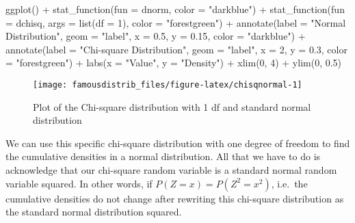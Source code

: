 \documentclass[
]{article}
\newenvironment{Shaded}{\begin{snugshade}}{\end{snugshade}}
\newcommand{\AttributeTok}[1]{\textcolor[rgb]{0.77,0.63,0.00}{#1}}
\newcommand{\DecValTok}[1]{\textcolor[rgb]{0.00,0.00,0.81}{#1}}
\newcommand{\FloatTok}[1]{\textcolor[rgb]{0.00,0.00,0.81}{#1}}
\newcommand{\FunctionTok}[1]{\textcolor[rgb]{0.00,0.00,0.00}{#1}}
\newcommand{\NormalTok}[1]{#1}
\newcommand{\SpecialCharTok}[1]{\textcolor[rgb]{0.00,0.00,0.00}{#1}}
\newcommand{\StringTok}[1]{\textcolor[rgb]{0.31,0.60,0.02}{#1}}
\begin{document}
\begin{Shaded}
\begin{Highlighting}[]
\FunctionTok{ggplot}\NormalTok{() }\SpecialCharTok{+}
  \FunctionTok{stat\_function}\NormalTok{(}\AttributeTok{fun =}\NormalTok{ dnorm,}
                \AttributeTok{color =} \StringTok{"darkblue"}\NormalTok{) }\SpecialCharTok{+}
  \FunctionTok{stat\_function}\NormalTok{(}\AttributeTok{fun =}\NormalTok{ dchisq,}
                \AttributeTok{args =} \FunctionTok{list}\NormalTok{(}\AttributeTok{df =} \DecValTok{1}\NormalTok{),}
                \AttributeTok{color =} \StringTok{"forestgreen"}\NormalTok{) }\SpecialCharTok{+}
  \FunctionTok{annotate}\NormalTok{(}\AttributeTok{label =} \StringTok{"Normal Distribution"}\NormalTok{, }\AttributeTok{geom =} \StringTok{"label"}\NormalTok{, }\AttributeTok{x =} \FloatTok{0.5}\NormalTok{, }\AttributeTok{y =} \FloatTok{0.15}\NormalTok{, }\AttributeTok{color =} \StringTok{"darkblue"}\NormalTok{) }\SpecialCharTok{+}
  \FunctionTok{annotate}\NormalTok{(}\AttributeTok{label =} \StringTok{"Chi{-}square Distribution"}\NormalTok{, }\AttributeTok{geom =} \StringTok{"label"}\NormalTok{, }\AttributeTok{x =} \DecValTok{2}\NormalTok{, }\AttributeTok{y =} \FloatTok{0.3}\NormalTok{, }\AttributeTok{color =} \StringTok{"forestgreen"}\NormalTok{) }\SpecialCharTok{+}
  \FunctionTok{labs}\NormalTok{(}\AttributeTok{x =} \StringTok{"Value"}\NormalTok{, }\AttributeTok{y =} \StringTok{"Density"}\NormalTok{) }\SpecialCharTok{+}
  \FunctionTok{xlim}\NormalTok{(}\DecValTok{0}\NormalTok{, }\DecValTok{4}\NormalTok{) }\SpecialCharTok{+}
  \FunctionTok{ylim}\NormalTok{(}\DecValTok{0}\NormalTok{, }\FloatTok{0.5}\NormalTok{)}
\end{Highlighting}
\end{Shaded}

\begin{figure}

{\centering \texttt{[image: famousdistrib\_files/figure-latex/chisqnormal-1]} 

}

\caption{Plot of the Chi-square distribution with 1 df and standard normal distribution}\label{fig:chisqnormal}
\end{figure}

We can use this specific chi-square distribution with one degree of freedom to find the cumulative densities in a normal distribution. All that we have to do is acknowledge that our chi-square random variable is a standard normal random variable squared. In other words, if \(P(Z=x)=P(Z^2=x^2)\), i.e.~the cumulative densities do not change after rewriting this chi-square distribution as the standard normal distribution squared.
\end{document}
